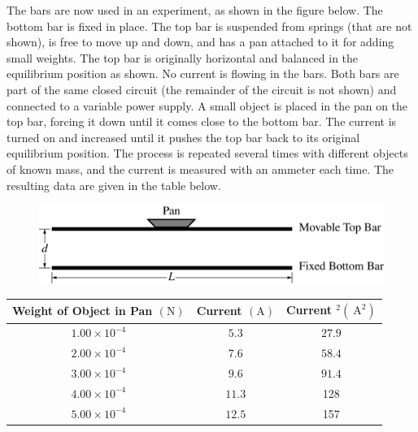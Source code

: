 \begin{parts}
%
The bars are now used in an experiment, as shown in the figure below. The bottom bar is fixed in place. The top bar is suspended from springs (that are not shown), is free to move up and down, and has a pan attached to it for adding small weights. The top bar is originally horizontal and balanced in the equilibrium position as shown. No current is flowing in the bars. Both bars are part of the same closed circuit (the remainder of the circuit is not shown) and connected to a variable power supply. A small object is placed in the pan on the top bar, forcing it down until it comes close to the bottom bar. The current is turned on and increased until it pushes the top bar back to its original equilibrium position. The process is repeated several times with different objects of known mass, and the current is measured with an ammeter each time. The resulting data are given in the table below.


\begin{figure}[H]
\centering
\includegraphics[scale=0.3]{images/img-018-030.png}
\end{figure}


\begin{table}[H]
\centering
\begin{tabular}{|c|c|c|}
\hline Weight of Object in Pan $(\mathrm{N})$ & Current $(\mathrm{A})$ & Current $^{2}\left(\mathrm{~A}^{2}\right)$ \\
\hline $1.00 \times 10^{-4}$ & $5.3$ & $27.9$ \\
\hline $2.00 \times 10^{-4}$ & $7.6$ & $58.4$ \\
\hline $3.00 \times 10^{-4}$ & $9.6$ & $91.4$ \\
\hline $4.00 \times 10^{-4}$ & $11.3$ & 128 \\
\hline $5.00 \times 10^{-4}$ & $12.5$ & 157 \\
\hline
\end{tabular}
\end{table}




\end{parts}
